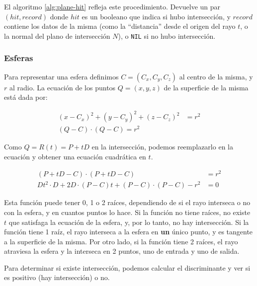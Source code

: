 El algoritmo \ref{alg:plane-hit} refleja este procedimiento. Devuelve un par
$(hit, record)$ donde $hit$ es un booleano que indica si hubo intersección, y
$record$ contiene los datos de la misma (como la ``distancia'' desde el origen
del rayo $t$, o la normal del plano de intersección $N$), o \texttt{NIL} si no
hubo intersección.

\subsubsection{Esferas}

Para representar una esfera definimos $C = (C_x, C_y, C_z)$ al centro de la
misma, y $r$ al radio. La ecuación de los puntos $Q=(x, y, z)$ de la superficie
de la misma está dada por:

\begin{align*}
  (x - C_x)^2 + (y - C_y)^2 + (z - C_z)^2 & = r^2 \\
  (Q - C) \cdot (Q - C) = r^2
\end{align*}

Como $Q = R(t) = P + tD$ en la intersección, podemos reemplazarlo en la ecuación
y obtener una ecuación cuadrática en $t$.

\begin{align*}
  (P + tD - C) \cdot (P + tD - C)                                  & = r^2 \\
  D t^2 \cdot D + 2D \cdot (P - C) t + (P - C) \cdot (P - C) - r^2 & = 0
  \label{eq:cuad-esfera}
\end{align*}

Esta función puede tener 0, 1 o 2 raíces, dependiendo de si el rayo interseca o
no con la esfera, y en cuantos puntos lo hace. Si la función no tiene raíces, no
existe $t$ que satisfaga la ecuación de la esfera, y, por lo tanto, no hay
intersección. Si la función tiene 1 raíz, el rayo interseca a la esfera en
\textbf{un} único punto, y es tangente a la superficie de la misma. Por otro
lado, si la función tiene 2 raíces, el rayo atraviesa la esfera y la interseca
en 2 puntos, uno de entrada y uno de salida.

Para determinar si existe intersección, podemos calcular el discriminante y ver
si es positivo (hay intersección) o no.

